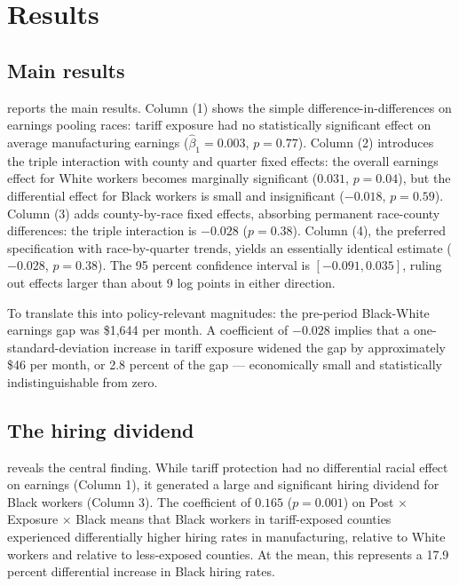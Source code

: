 \documentclass[12pt]{article}
\begin{document}
\section{Results}

\subsection{Main results}



 reports the main results. Column (1) shows the simple difference-in-differences on earnings pooling races: tariff exposure had no statistically significant effect on average manufacturing earnings ($\hat{\beta}_1 = 0.003$, $p = 0.77$). Column (2) introduces the triple interaction with county and quarter fixed effects: the overall earnings effect for White workers becomes marginally significant ($0.031$, $p = 0.04$), but the differential effect for Black workers is small and insignificant ($-0.018$, $p = 0.59$). Column (3) adds county-by-race fixed effects, absorbing permanent race-county differences: the triple interaction is $-0.028$ ($p = 0.38$). Column (4), the preferred specification with race-by-quarter trends, yields an essentially identical estimate ($-0.028$, $p = 0.38$). The 95 percent confidence interval is $[-0.091, 0.035]$, ruling out effects larger than about 9 log points in either direction.

To translate this into policy-relevant magnitudes: the pre-period Black-White earnings gap was \$1,644 per month. A coefficient of $-0.028$ implies that a one-standard-deviation increase in tariff exposure widened the gap by approximately \$46 per month, or 2.8 percent of the gap --- economically small and statistically indistinguishable from zero.

\subsection{The hiring dividend}



 reveals the central finding. While tariff protection had no differential racial effect on earnings (Column 1), it generated a large and significant hiring dividend for Black workers (Column 3). The coefficient of $0.165$ ($p = 0.001$) on Post $\times$ Exposure $\times$ Black means that Black workers in tariff-exposed counties experienced differentially higher hiring rates in manufacturing, relative to White workers and relative to less-exposed counties. At the mean, this represents a 17.9 percent differential increase in Black hiring rates.
\end{document}
